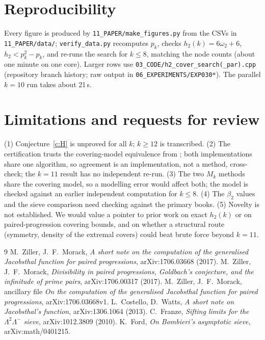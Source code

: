 \documentclass[11pt]{article}
\newcommand{\hh}{h_2}\newcommand{\wt}{\omega_2}
\begin{document}
\section{Reproducibility}
Every figure is produced by \texttt{11\_PAPER/make\_figures.py} from the CSVs in \texttt{11\_PAPER/data/}; \texttt{verify\_data.py} recomputes $p_k$, checks $\hh(k)=6\wt+6$, $\hh<p_k^2-p_k$, and re-runs the search for $k\le8$, matching the node counts (about one minute on one core). Larger rows use \texttt{03\_CODE/h2\_cover\_search(\_par).cpp} (repository branch history; raw output in \texttt{06\_EXPERIMENTS/EXP030*}). The parallel $k=10$ run takes about 21\,s.

\section{Limitations and requests for review}\label{sec:limits}
(1) Conjecture~\ref{c:H} is unproved for all $k$; $k\ge12$ is transcribed. (2) The certification trusts the covering-model equivalence from \cite{ZM3}; both implementations share one algorithm, so agreement is an implementation, not a method, cross-check; the $k=11$ result has no independent re-run. (3) The two $M_k$ methods share the covering model, so a modelling error would affect both; the model is checked against an earlier independent computation for $k\le8$. (4) The $\beta_2$ values and the sieve comparison need checking against the primary books. (5) Novelty is not established. We would value a pointer to prior work on exact $\hh(k)$ or on paired-progression covering bounds, and on whether a structural route (symmetry, density of the extremal covers) could beat brute force beyond $k=11$.

\begin{thebibliography}{9}
M.~Ziller, J.~F.~Morack, \emph{A short note on the computation of the generalised Jacobsthal function for paired progressions}, arXiv:1706.03668 (2017).
M.~Ziller, J.~F.~Morack, \emph{Divisibility in paired progressions, Goldbach's conjecture, and the infinitude of prime pairs}, arXiv:1706.00317 (2017).
M.~Ziller, J.~F.~Morack, ancillary file \emph{On the computation of the generalised Jacobsthal function for paired progressions}, arXiv:1706.03668v1.
L.~Costello, D.~Watts, \emph{A short note on Jacobsthal's function}, arXiv:1306.1064 (2013).
C.~Franze, \emph{Sifting limits for the $\Lambda^2\Lambda^-$ sieve}, arXiv:1012.3809 (2010).
K.~Ford, \emph{On Bombieri's asymptotic sieve}, arXiv:math/0401215.
\end{thebibliography}
\end{document}
